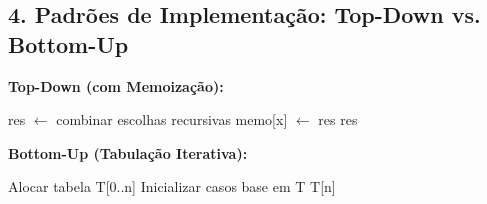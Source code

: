 \vspace{0.3cm}

\subsection*{4. Padrões de Implementação: Top-Down vs. Bottom-Up}

\noindent
\begin{minipage}[t]{0.48\textwidth}
\textbf{Top-Down (com Memoização):}
\begin{algorithm}[H]
\caption{Padrao-Top-Down(x, memo)}
res $\leftarrow$ combinar escolhas recursivas\;
memo[x] $\leftarrow$ res\;
\Return res\;
\end{algorithm}
\end{minipage}
\hfill
\begin{minipage}[t]{0.48\textwidth}
\textbf{Bottom-Up (Tabulação Iterativa):}
\begin{algorithm}[H]
\caption{Padrao-Bottom-Up(n)}
Alocar tabela T[0..n]\;
Inicializar casos base em T\;
\Return T[n]\;
\end{algorithm}
\end{minipage}
